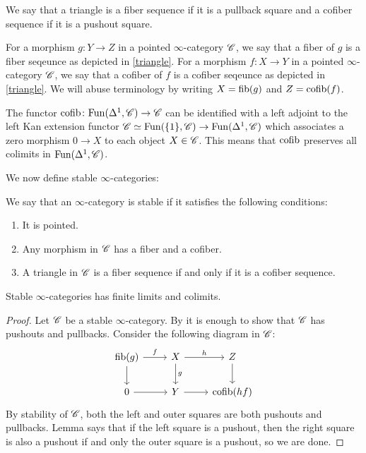 \documentclass[../../thesis.tex]{subfiles}
\begin{document}
\begin{definition}
    We say that a triangle is a fiber sequence if it is a pullback square and a cofiber sequence if it is a pushout square.
\end{definition}
\begin{definition}[{\cite[Definition 1.1.1.6.]{HA}}]
    For a morphism $g\colon Y \to Z$ in a pointed $\infty$-category $\mathscr{C}$, we say that a fiber of $g$ is a fiber seqeunce as depicted in \ref{triangle}.
    For a morphism $f\colon X \to Y$ in a pointed $\infty$-category $\mathscr{C}$, we say that a cofiber of $f$ is a cofiber seqeunce as depicted in \ref{triangle}.
    We will abuse terminology by writing $X = \operatorname{fib}(g)$ and $Z=\operatorname{cofib}(f)$.
\end{definition}
\begin{remark}[{\cite[Remark 1.1.1.8.]{HA}}]
    The functor $\operatorname{cofib}\colon \mathrm{Fun}(\Delta^1, \mathscr{C})\to \mathscr{C}$ can be identified with a left adjoint to the left Kan extension functor $\mathscr{C} \simeq \mathrm{Fun}(\{1\}, \mathscr{C}) \to \mathrm{Fun}(\Delta^1, \mathscr{C})$ which associates a zero morphism $0 \to X$ to each object $X \in \mathscr{C}$.
    This means that $\operatorname{cofib}$ preserves all colimits in $\mathrm{Fun}(\Delta^1, \mathscr{C})$.
\end{remark}
We now define stable $\infty$-categories:
\begin{definition}[{\cite[Definition 1.1.1.9.]{HA}}]
    We say that an $\infty$-category is stable if it satisfies the following conditions:
    \begin{enumerate}
        \item It is pointed.
        \item Any morphism in $\mathscr{C}$ has a fiber and a cofiber.
        \item A triangle in $\mathscr{C}$ is a fiber sequence if and only if it is a cofiber sequence.
    \end{enumerate}
\end{definition}
\begin{proposition}
    Stable $\infty$-categories has finite limits and colimits.
\end{proposition}
\begin{proof}
    Let $\mathscr{C}$ be a stable $\infty$-category.
    By \cite[Corollary 4.4.2.4.]{HTT} it is enough to show that $\mathscr{C}$ has pushouts and pullbacks.
    Consider the following diagram in $\mathscr{C}$:
    \[\begin{tikzcd}
            {\fib(g)} & X & Z \\
            0 & Y & {\cofib(hf)}
            \arrow["f", from=1-1, to=1-2]
            \arrow[from=2-1, to=2-2]
            \arrow["g", from=1-2, to=2-2]
            \arrow[from=1-1, to=2-1]
            \arrow[from=2-2, to=2-3]
            \arrow["h", from=1-2, to=1-3]
            \arrow[from=1-3, to=2-3]
        \end{tikzcd}\]
    By stability of $\mathscr{C}$, both the left and outer squares are both pushouts and pullbacks.
    Lemma \cite[4.4.2.1.]{HTT} says that if the left square is a pushout, then the right square is also a pushout if and only the outer square is a pushout, so we are done.
\end{proof}
\end{document}
